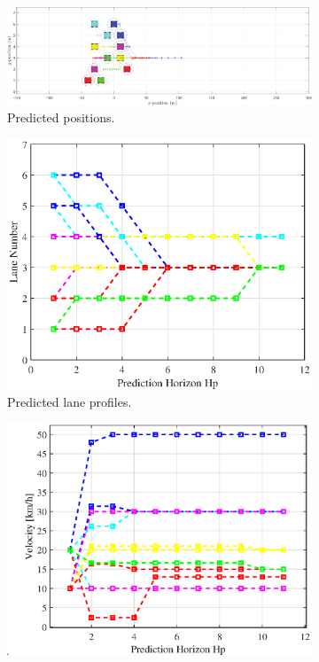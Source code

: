 \begin{figure}[H]
\centering
\begin{subfigure}[t]{\textwidth}
    \includegraphics[width=\textwidth]{Kap6/red_lane/red_lane_traj0.eps}
    \caption{Predicted positions.}
    \label{fig:first}
\end{subfigure}
\vspace{1cm}
\begin{subfigure}[b]{0.45\textwidth}
    \includegraphics[width=\textwidth]{Kap6/red_lane/red_lane_lane0.eps}
    \caption{Predicted lane profiles.}
    \label{fig:second}
\end{subfigure}
\hfill
\begin{subfigure}[b]{0.45\textwidth}
    \includegraphics[width=\textwidth]{Kap6/red_lane/red_lane_vel0.eps}

\end{subfigure}
\end{figure}
